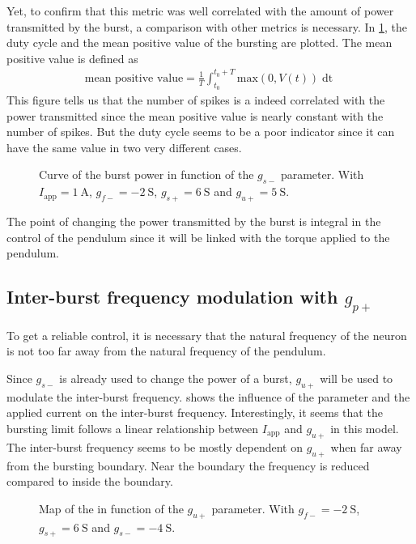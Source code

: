 Yet, to confirm that this metric was well correlated with the amount of power transmitted by the burst, a comparison with other metrics is necessary. In \cref{fig:neuron_burst_power}, the duty cycle and the mean positive value of the bursting are plotted. The mean positive value is defined as 
\begin{align}
    \text{mean positive value} = \frac{1}{T}\int_{t_0}^{t_0+T} \text{max}\left(0, V(t)\right) \mathop{\mathrm{d}t} 
\end{align}
This figure tells us that the number of spikes is a indeed correlated with the power transmitted since the mean positive value is nearly constant with the number of spikes. But the duty cycle seems to be a poor indicator since it can have the same value in two very different cases.

\begin{figure}[!htb]
    \centering
    \caption{Curve of the burst power in function of the $g_{s-}$ parameter. With $I_\text{app} = \qty{1}{\ampere}$, $g_{f-} = \qty{-2}{\siemens}$, $g_{s+} = \qty{6}{\siemens}$ and $g_{u+} = \qty{5}{\siemens}$.}
    \label{fig:neuron_burst_power}
\end{figure}

The point of changing the power transmitted by the burst is integral in the control of the pendulum since it will be linked with the torque applied to the pendulum.

\subsection{Inter-burst frequency modulation with $g_{p+}$}

To get a reliable control, it is necessary that the natural frequency of the neuron is not too far away from the natural frequency of the pendulum.

Since $g_{s-}$ is already used to change the power of a burst, $g_{u+}$ will be used to modulate the inter-burst frequency.  shows the influence of the parameter and the applied current on the inter-burst frequency. Interestingly, it seems that the bursting limit follows a linear relationship between $I_\text{app}$ and $g_{u+}$ in this model. The inter-burst frequency seems to be mostly dependent on $g_{u+}$ when far away from the bursting boundary. Near the boundary the frequency is reduced compared to inside the boundary.

\begin{figure}[!htb]
    \centering
    \caption{Map of the  in function of the $g_{u+}$ parameter. With $g_{f-} = \qty{-2}{\siemens}$, $g_{s+} = \qty{6}{\siemens}$ and $g_{s-} = \qty{-4}{\siemens}$.}
    \label{fig:neuron_burst_freq}
\end{figure}


